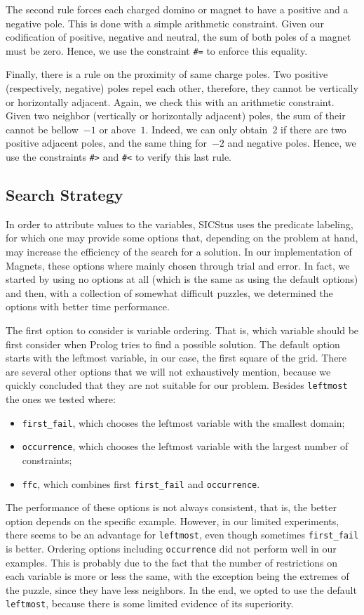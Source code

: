 \documentclass{llncs}
\begin{document}
The second rule forces each charged domino or magnet to have a positive and a negative pole. This is done with a simple arithmetic constraint. Given our codification of positive, negative and neutral, the sum of both poles of a magnet must be zero. Hence, we use the constraint \verb|#=| to enforce this equality.

Finally, there is a rule on the proximity of same charge poles. Two positive (respectively, negative) poles repel each other, therefore, they cannot be vertically or horizontally adjacent. Again, we check this with an arithmetic constraint. Given two neighbor (vertically or horizontally adjacent) poles, the sum of their cannot be bellow~$-1$ or above~$1$. Indeed, we can only obtain~$2$ if there are two positive adjacent poles, and the same thing for~$-2$ and negative poles. Hence, we use the constraints \verb|#>| and \verb|#<| to verify this last rule.

\subsection{Search Strategy} 

In order to attribute values to the variables, SICStus uses the predicate labeling, for which one may provide some options that, depending on the problem at hand, may increase the efficiency of the search for a solution. In our implementation of Magnets, these options where mainly chosen through trial and error. In fact, we started by using no options at all (which is the same as using the default options) and then, with a collection of somewhat difficult puzzles, we determined the options with better time performance. 

The first option to consider is variable ordering. That is, which variable should be first consider when Prolog tries to find a possible solution. The default option starts with the leftmost variable, in our case, the first square of the grid. There are several other options that we will not exhaustively mention, because we quickly concluded that they are not suitable for our problem. Besides \verb|leftmost| the ones we tested where:
\begin{itemize}
	\item \verb|first_fail|, which chooses the leftmost variable with the smallest domain;
	\item \verb|occurrence|, which chooses the leftmost variable with the largest number of constraints;
	\item \verb|ffc|, which combines first \verb|first_fail| and \verb|occurrence|.
\end{itemize}
The performance of these options is not always consistent, that is, the better option depends on the specific example. However, in our limited experiments, there seems to be an advantage for \verb|leftmost|, even though sometimes \verb|first_fail| is better. Ordering options including \verb|occurrence| did not perform well in our examples. This is probably due to the fact that the number of restrictions on each variable is more or less the same, with the exception being the extremes of the puzzle, since they have less neighbors. In the end, we opted to use the default \verb|leftmost|, because there is some limited evidence of its superiority.
\end{document}
